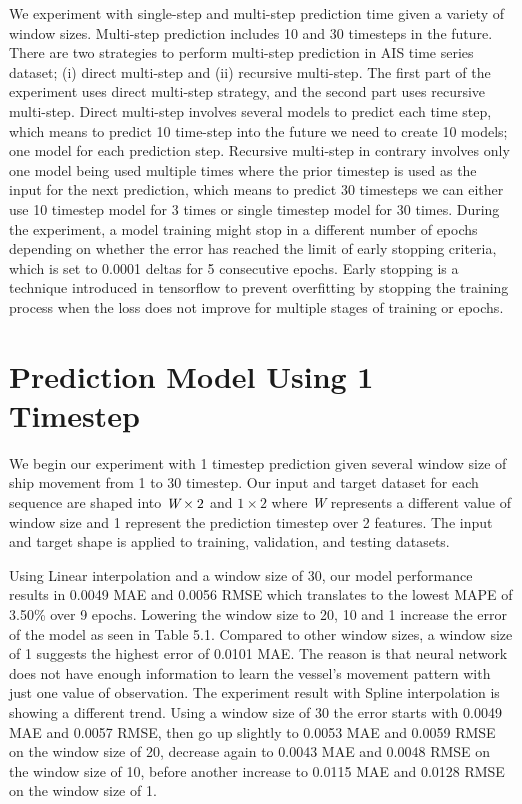 We experiment with single-step and multi-step prediction time given a variety of window sizes. Multi-step prediction includes 10 and 30 timesteps in the future. There are two strategies to perform multi-step prediction in AIS time series dataset; (i) direct multi-step and (ii) recursive multi-step. The first part of the experiment uses direct multi-step strategy, and the second part uses recursive multi-step. Direct multi-step involves several models to predict each time step, which means to predict 10 time-step into the future we need to create 10 models; one model for each prediction step. Recursive multi-step in contrary involves only one model being used multiple times where the prior timestep is used as the input for the next prediction, which means to predict 30 timesteps we can either use 10 timestep model for 3 times or single timestep model for 30 times. During the experiment, a model training might stop in a different number of epochs depending on whether the error has reached the limit of early stopping criteria, which is set to 0.0001 deltas for 5 consecutive epochs. Early stopping is a technique introduced in tensorflow to prevent overfitting by stopping the training process when the loss does not improve for multiple stages of training or epochs.

\section{Prediction Model Using 1 Timestep}
We begin our experiment with 1 timestep prediction given several window size of ship movement from 1 to 30 timestep. Our input and target dataset for each sequence are shaped into $\emph{W}\times2$ and $1\times2$ where \emph{W} represents a different value of window size and 1 represent the prediction timestep over 2 features. The input and target shape is applied to training, validation, and testing datasets.

Using Linear interpolation and a window size of 30, our model performance results in 0.0049 MAE and 0.0056 RMSE which translates to the lowest MAPE of 3.50\% over 9 epochs. Lowering the window size to 20, 10 and 1 increase the error of the model as seen in Table 5.1. Compared to other window sizes, a window size of 1 suggests the highest error of 0.0101 MAE. The reason is that neural network does not have enough information to learn the vessel's movement pattern with just one value of observation. The experiment result with Spline interpolation is showing a different trend. Using a window size of 30 the error starts with 0.0049 MAE and 0.0057 RMSE, then go up slightly to 0.0053 MAE and 0.0059 RMSE on the window size of 20, decrease again to 0.0043 MAE and 0.0048 RMSE on the window size of 10, before another increase to 0.0115 MAE and 0.0128 RMSE on the window size of 1. 

